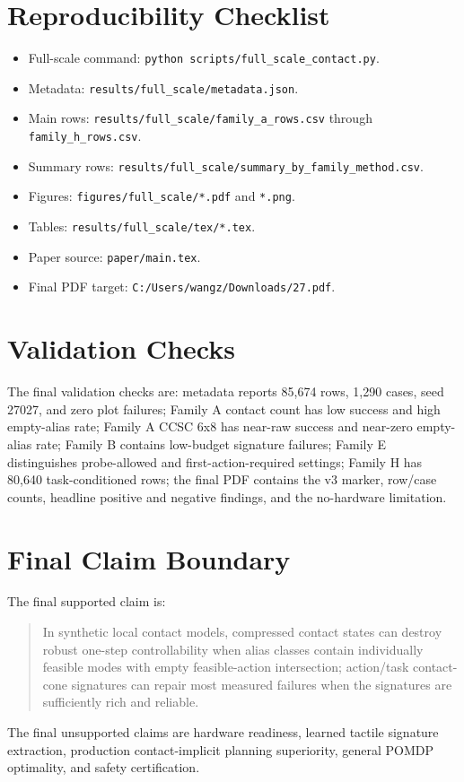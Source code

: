 \documentclass{article}
\begin{document}
\section{Reproducibility Checklist}
\begin{itemize}[leftmargin=*]
\item Full-scale command: \texttt{python scripts/full\_scale\_contact.py}.
\item Metadata: \texttt{results/full\_scale/metadata.json}.
\item Main rows: \texttt{results/full\_scale/family\_a\_rows.csv} through \texttt{family\_h\_rows.csv}.
\item Summary rows: \texttt{results/full\_scale/summary\_by\_family\_method.csv}.
\item Figures: \texttt{figures/full\_scale/*.pdf} and \texttt{*.png}.
\item Tables: \texttt{results/full\_scale/tex/*.tex}.
\item Paper source: \texttt{paper/main.tex}.
\item Final PDF target: \texttt{C:/Users/wangz/Downloads/27.pdf}.
\end{itemize}

\section{Validation Checks}
The final validation checks are: metadata reports 85,674 rows, 1,290 cases, seed 27027, and zero plot failures; Family A contact count has low success and high empty-alias rate; Family A CCSC 6x8 has near-raw success and near-zero empty-alias rate; Family B contains low-budget signature failures; Family E distinguishes probe-allowed and first-action-required settings; Family H has 80,640 task-conditioned rows; the final PDF contains the v3 marker, row/case counts, headline positive and negative findings, and the no-hardware limitation.

\section{Final Claim Boundary}
The final supported claim is:
\begin{quote}
In synthetic local contact models, compressed contact states can destroy robust one-step controllability when alias classes contain individually feasible modes with empty feasible-action intersection; action/task contact-cone signatures can repair most measured failures when the signatures are sufficiently rich and reliable.
\end{quote}
The final unsupported claims are hardware readiness, learned tactile signature extraction, production contact-implicit planning superiority, general POMDP optimality, and safety certification.
\end{document}
